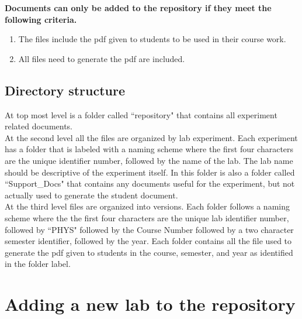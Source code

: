 \documentclass[justified]{book}
\begin{document}
{\bf Documents can only be added to the repository if they meet the following criteria.}
\begin{enumerate}
\item The files include the pdf given to students to be used in their course work.
\item All files need to generate the pdf are included.
\end{enumerate}

\subsection{Directory structure}

At top most level is a folder called ``repository" that contains all experiment related documents.\\

\noindent At the second level all the files are organized by lab experiment. Each experiment has a folder that is labeled with a naming scheme where the first four characters are the unique identifier number, followed by the name of the lab. The lab name should be descriptive of the experiment itself. In this folder is also a folder called ``Support\_Docs" that contains any documents useful for the experiment, but not actually used to generate the student document. \\

\noindent At the third level files are organized into versions. Each folder follows a naming scheme where the the first four characters are the unique lab identifier number, followed by ``PHYS" followed by the Course Number followed by a two character semester identifier, followed by the year. Each folder contains all the file used to generate the pdf given to students in the course, semester, and year as identified in the folder label. \\





\section{Adding a new lab to the repository}
\end{document}
